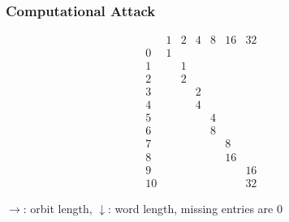 \documentclass[handout,10pt]{ksbeamer}
\let\ov=\underline
\begin{document}
\begin{frame}
\frametitle{Computational Attack}

$$
\begin{array}{r||cccccccc}
   &  1  &  2  &  4  &  8  &  16 &  32 &          \\
\hline
0  &  1  &     &     &     &     &     &    &   \\
1  &     &  1  &     &     &     &     &    &   \\
2  &     &  2  &     &     &     &     &    &   \\
3  &     &     &  2  &     &     &     &    &   \\
4  &     &     &  4  &     &     &     &    &   \\
5  &     &     &     &  4  &     &     &    &   \\
6  &     &     &     &  8  &     &     &    &   \\
7  &     &     &     &     &  8  &     &    &   \\
8  &     &     &     &     &  16 &     &    &   \\
9  &     &     &     &     &     &  16 &    &   \\
10 &     &     &     &     &     &  32 &    &   
\end{array}
$$
\vspace{2ex} 

$\to$: orbit length, $\downarrow$: word length, missing entries are 0

\end{frame}

  



\end{document}

